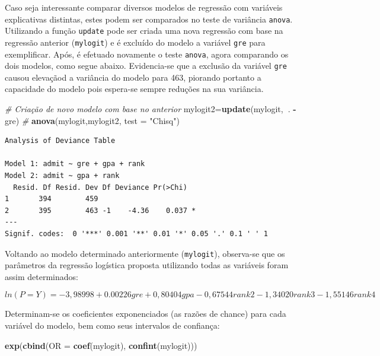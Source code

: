 \documentclass[12pt,brazil,oneside]{book}
\newenvironment{Shaded}{\begin{snugshade}}{\end{snugshade}}
\newcommand{\CommentTok}[1]{\textcolor[rgb]{0.56,0.35,0.01}{\textit{#1}}}
\newcommand{\DataTypeTok}[1]{\textcolor[rgb]{0.13,0.29,0.53}{#1}}
\newcommand{\KeywordTok}[1]{\textcolor[rgb]{0.13,0.29,0.53}{\textbf{#1}}}
\newcommand{\NormalTok}[1]{#1}
\newcommand{\OperatorTok}[1]{\textcolor[rgb]{0.81,0.36,0.00}{\textbf{#1}}}
\newcommand{\StringTok}[1]{\textcolor[rgb]{0.31,0.60,0.02}{#1}}
\begin{document}
Caso seja interessante comparar diversos modelos de regressão com
variáveis explicativas distintas, estes podem ser comparados no teste de
variância \texttt{anova}. Utilizando a função \texttt{update} pode ser
criada uma nova regressão com base na regressão anterior
(\texttt{mylogit}) e é excluído do modelo a variável \texttt{gre} para
exemplificar. Após, é efetuado novamente o teste \texttt{anova}, agora
comparando os dois modelos, como segue abaixo. Evidencia-se que a
exclusão da variável \texttt{gre} causou elevaçãod a variância do modelo
para 463, piorando portanto a capacidade do modelo pois espera-se sempre
reduções na sua variância.

\begin{Shaded}
\begin{Highlighting}[]
\CommentTok{# Criação de novo modelo com base no anterior}
\NormalTok{mylogit2=}\KeywordTok{update}\NormalTok{(mylogit,}\OperatorTok{~}\NormalTok{. }\OperatorTok{-}\StringTok{ }\NormalTok{gre)}
\CommentTok{# }
\KeywordTok{anova}\NormalTok{(mylogit,mylogit2, }\DataTypeTok{test =} \StringTok{"Chisq"}\NormalTok{)}
\end{Highlighting}
\end{Shaded}

\begin{verbatim}
Analysis of Deviance Table

Model 1: admit ~ gre + gpa + rank
Model 2: admit ~ gpa + rank
  Resid. Df Resid. Dev Df Deviance Pr(>Chi)  
1       394        459                       
2       395        463 -1    -4.36    0.037 *
---
Signif. codes:  0 '***' 0.001 '**' 0.01 '*' 0.05 '.' 0.1 ' ' 1
\end{verbatim}

Voltando ao modelo determinado anteriormente (\texttt{mylogit}),
observa-se que os parâmetros da regressão logística proposta utilizando
todas as variáveis foram assim determinados:

\[
ln(P=Y) = 
-3,98998 + 0.00226gre + 0,80404gpa -0,67544rank2 -1,34020rank3 -1,55146rank4
\]

Determinam-se os coeficientes exponenciados (as razões de chance) para
cada variável do modelo, bem como seus intervalos de confiança:

\begin{Shaded}
\begin{Highlighting}[]
\KeywordTok{exp}\NormalTok{(}\KeywordTok{cbind}\NormalTok{(}\DataTypeTok{OR =} \KeywordTok{coef}\NormalTok{(mylogit), }\KeywordTok{confint}\NormalTok{(mylogit)))}
\end{Highlighting}
\end{Shaded}
\end{document}
